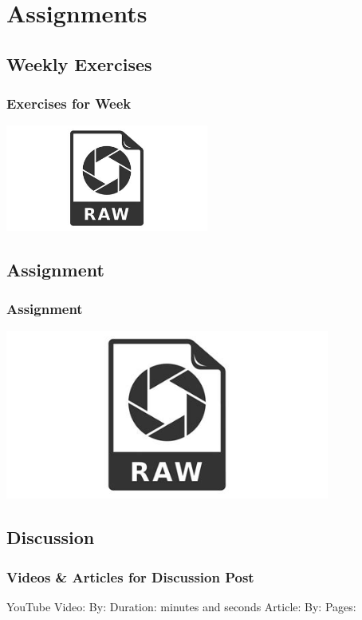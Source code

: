 \documentclass{beamer}
\begin{document}
		\section{Assignments}
			\subsection{Weekly Exercises}		
			\begin{frame}
				\frametitle{Exercises for Week }
				\begin{outline}
					\1 
					\1 
					\1 
					\1 
					\1 
				\end{outline}
				\includegraphics[width=0.5\textwidth]{images/raw.jpg}
			\end{frame}
		
		\subsection{Assignment}		
			\begin{frame}
				\frametitle{Assignment }
				\begin{outline}
					\1 
					\1 
					\1 
					\1 
					\1 
				\end{outline}
			\includegraphics[width=0.8\textwidth]{images/raw.jpg}
			\end{frame}
	
			\subsection{Discussion}		
				\begin{frame}
					\frametitle{Videos \& Articles for Discussion Post}
					\begin{outline}
						\1 YouTube Video:  
							\2 By:          
							\2 Duration:      minutes and  seconds
						\1 Article:   
							\2 By:     
							\2 Pages:   
					\end{outline}
					
				\end{frame}
\end{document}
